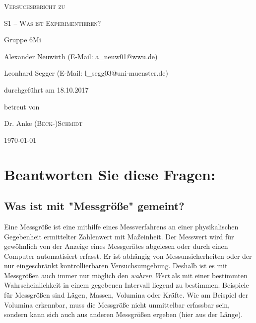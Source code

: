 \documentclass[
	a4paper,
	12pt,
	pagesize,
	ngerman
]{scrartcl}
\begin{document}
	\begin{titlepage}
		\centering
		{\scshape\LARGE Versuchsbericht zu \par}
		\vspace{1cm}
		{\scshape\huge S1 -- Was ist Experimentieren?\par}
		\vspace{2.5cm}
		{\LARGE Gruppe 6Mi \par}
		\vspace{0.5cm}
		
		{\large Alexander Neuwirth (E-Mail: a\_neuw01@wwu.de) \par}
		{\large Leonhard Segger (E-Mail: l\_segg03@uni-muenster.de) \par}
		\vfill
		
		durchgeführt am 18.10.2017\par
		betreut von\par
		{\large Dr. Anke \textsc{(Beck-)Schmidt}} %
		
		\vfill
		
		{\large \today\par}
	\end{titlepage}
	\tableofcontents
	
	\newpage
	\section{Beantworten Sie diese Fragen:}
	
	\subsection{Was ist mit "Messgröße" gemeint?}
	Eine Messgröße ist eine mithilfe eines Messverfahrens an einer physikalischen Gegebenheit ermittelter Zahlenwert mit Maßeinheit. Der Messwert wird für gewöhnlich von der Anzeige eines Messgerätes abgelesen oder durch einen Computer automatisiert erfasst. Er ist abhängig von Messunsicherheiten oder der nur eingeschränkt kontrollierbaren Versuchsumgebung. Deshalb ist es mit Messgrößen auch immer nur möglich den \textit{wahren Wert} als mit einer bestimmten Wahrscheinlichkeit in einem gegebenen Intervall liegend zu bestimmen. Beispiele für Messgrößen sind Lägen, Massen, Volumina oder Kräfte. Wie am Beispiel der Volumina erkennbar, muss die Messgröße nicht unmittelbar erfassbar sein, sondern kann sich auch aus anderen Messgrößen ergeben (hier aus der Länge).
	
\end{document}
